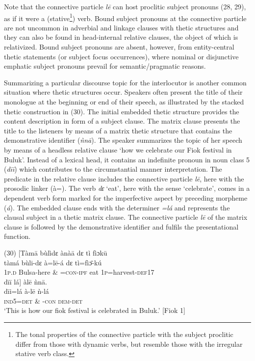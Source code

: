 \documentclass[output=paper]{langsci/langscibook}
\begin{document}
Note that the connective particle \textit{l\={e} }can host proclitic subject pronouns (28, 29), as if it were a (stative\footnote{ The tonal properties of the connective particle with the subject proclitic differ from those with dynamic verbs, but resemble those with the irregular stative verb class.}) verb. Bound subject pronouns at the connective particle are not uncommon in adverbial and linkage clauses with thetic structures and they can also be found in head-internal relative clauses, the object of which is relativized. Bound subject pronouns are absent, however, from entity-central thetic statements (or subject focus occurrences), where nominal or disjunctive emphatic subject pronouns prevail for semantic/pragmatic reasons.

Summarizing a particular discourse topic for the interlocutor is another common situation where thetic structures occur. Speakers often present the title of their monologue at the beginning or end of their speech, as illustrated by the stacked thetic construction in (30). The initial embedded thetic structure provides the content description in form of a subject clause. The matrix clause presents the title to the listeners by means of a matrix thetic structure that contains the demonstrative identifier (\textit{ǹn\={a}}). The speaker summarizes the topic of her speech by means of a headless relative clause ‘how we celebrate our Fiok festival in Buluk’. Instead of a lexical head, it contains an indefinite pronoun in noun class 5 (\textit{d\={i}\={i}}) which contributes to the circumstantial manner interpretation. The predicate in the relative clause includes the connective particle \textit{l\={e}},\textit{ }here with the prosodic linker (à=). The verb \textit{dɛ}\textit{}‘eat’, here with the sense ‘celebrate’, comes in a dependent verb form marked for the imperfective aspect by preceding morpheme (\textit{á}). The embedded clause ends with the determiner \textit{=lá }and represents the clausal subject in a thetic matrix clause. The connective particle \textit{l\={e} }of the matrix clause is followed by the demonstrative identifier and fulfils the presentational function.

\gll \textup{(30)}  \textup{[}Tàm\={a}  bùlìdɛ    ànà\={a}    dɛ  tì   fìɔk\={u}\\
\gll \textup{   tàmá  bùli-dɛ    à=l\={e}-á    dɛ  tì=fìɔ}\textup{\={ }}\textup{{}-kú}\\
       1\textsc{p}.\textsc{d}  Bulsa-here      \& =\textsc{con}{}-\textsc{ipf}    eat  1\textsc{p}=harvest-\textsc{def}17  \\
\gll   d\={i}\={i}  lá\textup{]  }àl\={e}    ǹn\={a}.\\
\gll \textup{  d\={i}i=lá    à-l\={e}    ǹ-lá}\\
     \textsc{  ind5=det     \& -con    dem-det}\\
\glt ‘This is how our fiok festival is celebrated in Buluk.’ [Fiok 1]
\z
\end{document}
